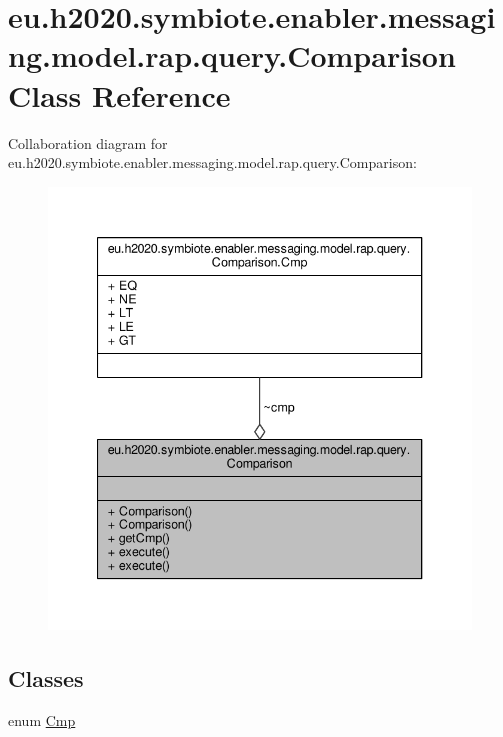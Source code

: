 \hypertarget{classeu_1_1h2020_1_1symbiote_1_1enabler_1_1messaging_1_1model_1_1rap_1_1query_1_1Comparison}{}\section{eu.\+h2020.\+symbiote.\+enabler.\+messaging.\+model.\+rap.\+query.\+Comparison Class Reference}
\label{classeu_1_1h2020_1_1symbiote_1_1enabler_1_1messaging_1_1model_1_1rap_1_1query_1_1Comparison}


Collaboration diagram for eu.\+h2020.\+symbiote.\+enabler.\+messaging.\+model.\+rap.\+query.\+Comparison\+:
\nopagebreak
\begin{figure}[H]
\begin{center}
\leavevmode
\includegraphics[width=340pt]{classeu_1_1h2020_1_1symbiote_1_1enabler_1_1messaging_1_1model_1_1rap_1_1query_1_1Comparison__coll__graph}
\end{center}
\end{figure}
\subsection*{Classes}
\begin{DoxyCompactItemize}
\item 
enum \hyperlink{enumeu_1_1h2020_1_1symbiote_1_1enabler_1_1messaging_1_1model_1_1rap_1_1query_1_1Comparison_1_1Cmp}{Cmp}
\end{DoxyCompactItemize}
